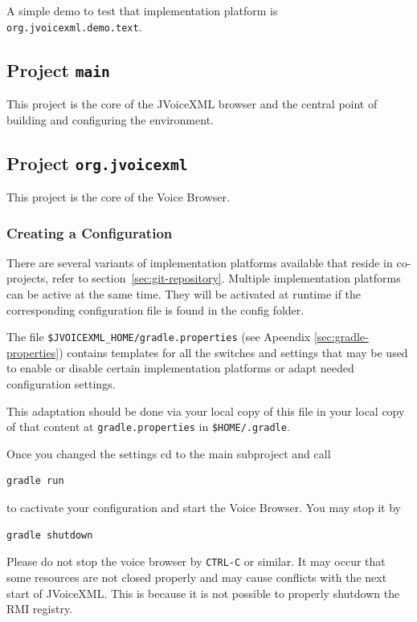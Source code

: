 \documentclass[11pt,a4paper]{article}
\begin{document}
A simple demo to test that implementation platform is
\lstinline{org.jvoicexml.demo.text}.

\subsection{Project \texttt{main}}

This project is the core of the JVoiceXML browser and the central point of
building and configuring the environment.

\subsection{Project \texttt{org.jvoicexml}}

This project is the core of the Voice Browser.

\subsubsection{Creating a Configuration}
\label{sec:create-configuration}

There are several variants of implementation platforms available
that reside in co-projects, refer to section~\ref{sec:git-repository}. Multiple
implementation platforms can be active at the same time. They will be activated at runtime
if the corresponding configuration file is found in the config folder.

The file \texttt{\$JVOICEXML\_HOME/gradle.properties} (see Apeendix \ref{sec:gradle-properties}) 
contains templates for all
the switches and settings that may be used to enable or disable certain
implementation platforms or adapt needed configuration settings.

This adaptation should be done via your local copy of this file in your
local copy of that content at \texttt{gradle.properties} in
\texttt{\$HOME/.gradle}.

Once you changed the settings cd to the main subproject and call
\begin{lstlisting}
gradle run
\end{lstlisting}
to cactivate your configuration and start the Voice Browser.
You may stop it by
\begin{lstlisting}
gradle shutdown
\end{lstlisting}

Please do not stop the voice browser by \texttt{CTRL-C} or similar. It may occur
that some resources are not closed properly and may cause conflicts with the next
start of JVoiceXML. This is because it is not possible to properly shutdown the
RMI registry.
\end{document}

